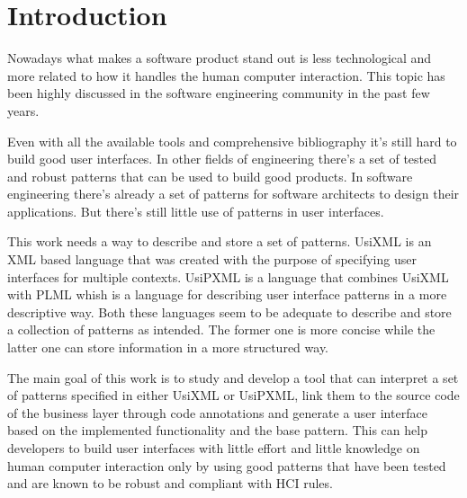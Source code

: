 \section{Introduction}
Nowadays what makes a software product stand out is less technological and more related to how it handles the human computer interaction. This topic has been highly discussed in the software engineering community in the past few years.

Even with all the available tools and comprehensive bibliography it's still hard to build good user interfaces. In other fields of engineering there's a set of tested and robust patterns that can be used to build good products. In software engineering there's already a set of patterns for software architects to design their applications. But there's still little use of patterns in user interfaces.

This work needs a way to describe and store a set of patterns. UsiXML is an XML based language that was created with the purpose of specifying user interfaces for multiple contexts. UsiPXML is a language that combines UsiXML with PLML whish is a language for describing user interface patterns in a more descriptive way. Both these languages seem to be adequate to describe and store a collection of patterns as intended. The former one is more concise while the latter one can store information in a more structured way.

The main goal of this work is to study and develop a tool that can interpret a set of patterns specified in either UsiXML or UsiPXML, link them to the source code of the business layer through code annotations and generate a user interface based on the implemented functionality and the base pattern. This can help developers to build user interfaces with little effort and little knowledge on human computer interaction only by using good patterns that have been tested and are known to be robust and compliant with HCI rules.